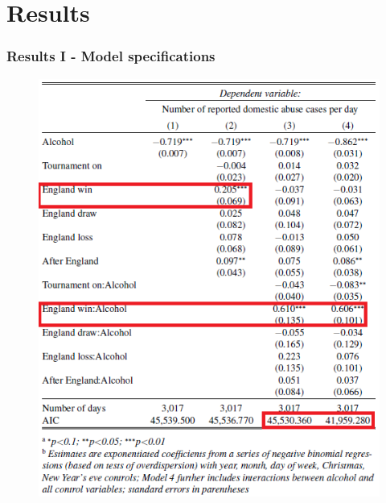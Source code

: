 \documentclass[hyperref={pdfpagelabels=false}]{beamer}
\begin{document}
\section{Results} 
\begin{frame}
\frametitle{Results I - Model specifications}
\begin{center}
\begin{figure}
\includegraphics[scale=0.55]{result1.png}
\end{figure}
\end{center}
\end{frame}
\end{document}
